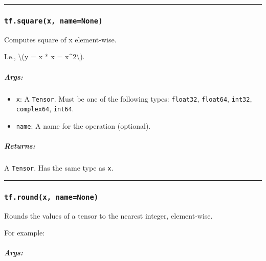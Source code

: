 \begin{center}\rule{0.5\linewidth}{\linethickness}\end{center}

\subsubsection{\texorpdfstring{\texttt{tf.square(x,\ name=None)}
}{tf.square(x, name=None) }}\label{tf.squarex-namenone}

Computes square of x element-wise.

I.e., \textbackslash{}(y = x * x = x\^{}2\textbackslash{}).

\subparagraph{Args: }\label{args-10}

\begin{itemize}
\tightlist
\item
  \texttt{x}: A \texttt{Tensor}. Must be one of the following types:
  \texttt{float32}, \texttt{float64}, \texttt{int32},
  \texttt{complex64}, \texttt{int64}.
\item
  \texttt{name}: A name for the operation (optional).
\end{itemize}

\subparagraph{Returns: }\label{returns-10}

A \texttt{Tensor}. Has the same type as \texttt{x}.

\begin{center}\rule{0.5\linewidth}{\linethickness}\end{center}

\subsubsection{\texorpdfstring{\texttt{tf.round(x,\ name=None)}
}{tf.round(x, name=None) }}\label{tf.roundx-namenone}

Rounds the values of a tensor to the nearest integer, element-wise.

For example:

\begin{Shaded}
\begin{Highlighting}[]
\OperatorTok{==>} \NormalTok{[ }\NormalTok{, }\NormalTok{, }\NormalTok{, }\OperatorTok{-} \NormalTok{]}
\end{Highlighting}
\end{Shaded}

\subparagraph{Args: }\label{args-11}

